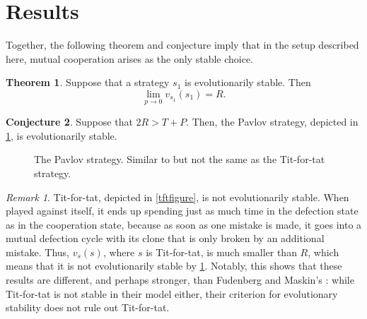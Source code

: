 \documentclass[12pt]{article}
\theoremstyle{definition}
\newtheorem{theorem}{Theorem}[section]
\newtheorem{conjecture}[theorem]{Conjecture}
\theoremstyle{remark}
\newtheorem*{remark}{Remark}
\begin{document}


\section{Results}
\label{sectionresults}

Together, the following theorem and conjecture imply that in the setup described here, mutual cooperation arises as the only stable choice.

\begin{theorem}
  \label{evolutionarystable1}
  Suppose that a strategy $s_1$ is evolutionarily stable. Then \begin{equation*}
  \lim_{p \to 0} v_{s_1}(s_1) = R.
  \end{equation*}
\end{theorem}

\begin{conjecture}
  \label{pavlovtheorem}
  Suppose that $2R > T + P$. Then, the Pavlov strategy, depicted in \cref{pavlovfigure}, is evolutionarily stable.
\end{conjecture}

\begin{figure}
  \centering
  \caption{The Pavlov strategy. Similar to but not the same as the Tit-for-tat strategy.}
  \label{pavlovfigure}
\end{figure}


\begin{remark}
  Tit-for-tat, depicted in \cref{tftfigure}, is not evolutionarily stable. 
  When played against itself, it ends up spending just as much time in the defection state as in the cooperation state, because as soon as one mistake is made, it goes into a mutual defection cycle with its clone that is only broken by an additional mistake.
  Thus, $v_s(s)$, where $s$ is Tit-for-tat, is much smaller than $R$, which means that it is not evolutionarily stable by \cref{evolutionarystable1}. Notably, this shows that these results are different, and perhaps stronger, than Fudenberg and Maskin's \cite{fundenberg1990evolution}: while Tit-for-tat is not stable in their model either, their criterion for evolutionary stability does not rule out Tit-for-tat.
\end{remark}
\end{document}
